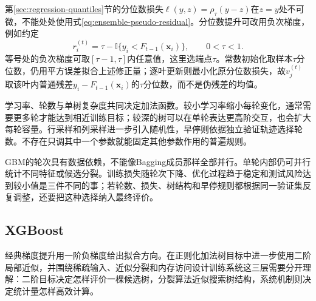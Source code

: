 第\ref{sec:regression-quantiles}节的分位数损失$\ell(y,z)=\rho_\tau(y-z)$在$z=y$处不可微，不能处处使用式\eqref{eq:ensemble-pseudo-residual}。分位数提升可改用负次梯度，例如约定
\begin{equation}
  r_i^{(t)}
  =\tau-\mathbb{I}\{y_i<F_{t-1}(\bm{x}_i)\},
  \qquad 0<\tau<1.
  \label{eq:ensemble-quantile-pseudo-residual}
\end{equation}
等号处的负次梯度可取$[\tau-1,\tau]$内任意值，这里选端点$\tau$。常数初始化取样本$\tau$分位数，仍用平方误差拟合上述修正量；逐叶更新则最小化原分位数损失，故$v_j^{(t)}$取该叶内普通残差$y_i-F_{t-1}(\bm{x}_i)$的$\tau$分位数，而不是伪残差的均值。

学习率、轮数与单树复杂度共同决定加法函数。较小学习率缩小每轮变化，通常需要更多轮才能达到相近训练目标；较深的树可以在单轮表达更高阶交互，也会扩大每轮容量。行采样和列采样进一步引入随机性，早停则依据独立验证轨迹选择轮数。不存在只调其中一个参数就能固定其他参数作用的普遍规则。

GBM的轮次具有数据依赖，不能像Bagging成员那样全部并行。单轮内部仍可并行统计不同特征或候选分裂。训练损失随轮次下降、优化过程趋于稳定和测试风险达到较小值是三件不同的事；若轮数、损失、树结构和早停规则都根据同一验证集反复调整，还要把这种选择纳入最终评价。

\subsection{XGBoost}
\label{sec:ensemble-xgboost}

经典梯度提升用一阶负梯度给出拟合方向。在正则化加法树目标中进一步使用二阶局部近似，并围绕稀疏输入、近似分裂和内存访问设计训练系统这三层需要分开理解：二阶目标决定怎样评价一棵候选树，分裂算法近似搜索树结构，系统机制则决定统计量怎样高效计算。

